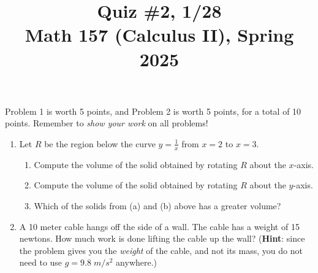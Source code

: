 \documentclass[11pt]{article}
\title{Quiz \#2, 1/28 \\ Math 157 (Calculus II), Spring 2025}
\date{}
\begin{document}
\maketitle

\thispagestyle{empty}

\vspace{-2cm}

Problem 1 is worth 5 points, and Problem 2 is worth 5 points, for a total of 10 points. Remember to \emph{show your work} on all problems!

\begin{enumerate}
\item Let $R$ be the region below the curve $y=\frac{1}{x}$ from $x=2$ to $x=3$.
\begin{enumerate}
\item Compute the volume of the solid obtained by rotating $R$ about the $x$-axis.
\item Compute the volume of the solid obtained by rotating $R$ about the $y$-axis.
\item Which of the solids from (a) and (b) above has a greater volume?
\end{enumerate}

\vspace{8cm}

\item A 10 meter cable hangs off the side of a wall. The cable has a weight of 15 newtons. How much work is done lifting the cable up the wall? ({\bf Hint}: since the problem gives you the \emph{weight} of the cable, and not its mass, you do not need to use $g=9.8 \; m/s^2$ anywhere.)

\end{enumerate}
\end{document}
